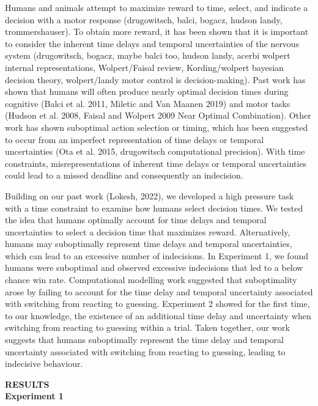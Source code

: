 \documentclass[12pt,letterpaper]{article}
\begin{document}
Humans and animals attempt to maximize reward to time, select, and indicate a decision with a motor response (drugowitsch, balci, bogacz, hudson landy, trommershauser). To obtain more reward, it has been shown that it is important to consider the inherent time delays and temporal uncertainties of the nervous system (drugowitsch, bogacz, maybe balci too, hudson landy, acerbi wolpert internal representations, Wolpert/Faisal review, Kording/wolpert bayesian decision theory, wolpert/landy motor control is decision-making). Past work has shown that humans will often produce nearly optimal decision times during cognitive (Balci et al. 2011, Miletic and Van Maanen 2019) and motor tasks (Hudson et al. 2008, Faisal and Wolpert 2009 Near Optimal Combination). Other work has shown suboptimal action selection or timing, which has been suggested to occur from an imperfect representation of time delays or temporal uncertainties (Ota et al. 2015, drugowitsch computational precision). With time constraints, misrepresentations of inherent time delays or temporal uncertainties could lead to a missed deadline and consequently an indecision.

Building on our past work (Lokesh, 2022), we developed a high pressure task with a time constraint to examine how humans select decision times. We tested the idea that humans optimally account for time delays and temporal uncertainties to select a decision time that maximizes reward. Alternatively, humans may suboptimally represent time delays and temporal uncertainties, which can lead to an excessive number of indecisions. In Experiment 1, we found humans were suboptimal and observed excessive indecisions that led to a below chance win rate. Computational modelling work suggested that suboptimality arose by failing to account for the time delay and temporal uncertainty associated with switching from reacting to guessing. Experiment 2 showed for the first time, to our knowledge, the existence of an additional time delay and uncertainty when switching from reacting to guessing within a trial. Taken together, our work suggests that humans suboptimally represent the time delay and temporal uncertainty associated with switching from reacting to guessing, leading to indecisive behaviour.

\newpage
\noindent\textbf{\large\textcolor{mydarkblue}{RESULTS}}
\vspace{2mm}
\\
\textbf{\textcolor{mydarkblue}{{Experiment 1}}}
\vspace{2mm}
\end{document}
